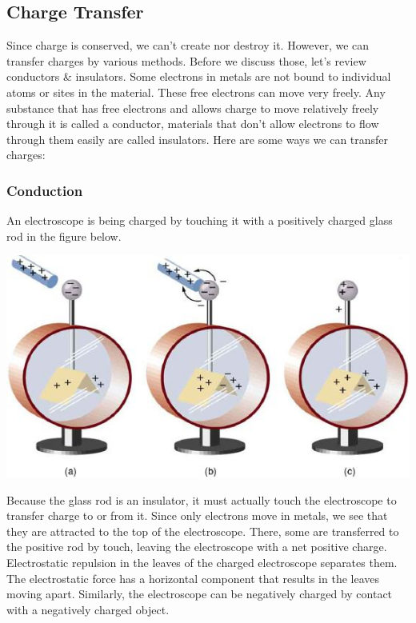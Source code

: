\documentclass[9pt]{article}
\begin{document}
	\subsection*{Charge Transfer} 
	Since charge is conserved, we can't create nor destroy it. However, we can transfer charges by various methods. Before we discuss those, let's review conductors \& insulators.  Some electrons in metals are not bound to individual atoms or sites in the material. These free electrons can move very freely. Any substance that has free electrons and allows charge to move relatively freely through it is called a conductor, materials that don't allow electrons to flow through them easily are called insulators. Here are some ways we can transfer charges:
	\subsubsection*{Conduction}
	 An electroscope is being charged by touching it with a positively charged glass rod in the figure below.
	 \begin{center}
	 	\includegraphics[scale=0.3]{electroscope}
	 \end{center} Because the glass rod is an insulator, it must actually touch the electroscope to transfer charge to or from it. Since only electrons move in metals, we see that they are attracted to the top of the electroscope. There, some are transferred to the positive rod by touch, leaving the electroscope with a net positive charge. Electrostatic repulsion in the leaves of the charged electroscope separates them. The electrostatic force has a horizontal component that results in the leaves moving apart. Similarly, the electroscope can be negatively charged by contact with a negatively charged object.
\end{document}
